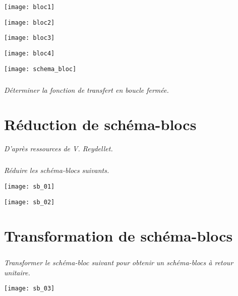 \begin{multicols}{2}
\begin{corrige}
\begin{minipage}[c]{.23\linewidth}
\begin{center}
\texttt{[image: bloc1]}
\end{center}
\end{minipage}\hfill
\begin{minipage}[c]{.23\linewidth}
\begin{center}
\texttt{[image: bloc2]}
\end{center}
\end{minipage}\hfill
\begin{minipage}[c]{.23\linewidth}
\begin{center}
\texttt{[image: bloc3]}
\end{center}
\end{minipage}\hfill
\begin{minipage}[c]{.23\linewidth}
\begin{center}
\texttt{[image: bloc4]}
\end{center}
\end{minipage}



\begin{center}
\texttt{[image: schema\_bloc]}
\end{center}
\end{corrige}
\else 
\fi


\subparagraph{}
\textit{Déterminer la fonction de transfert en boucle fermée.}





\section*{Réduction de schéma-blocs}
\textit{D'après ressources de V. Reydellet.}
\subparagraph*{}
\textit{Réduire les schéma-blocs suivants.}
\begin{center}
\texttt{[image: sb\_01]}
\end{center}

\begin{center}
\texttt{[image: sb\_02]}
\end{center}

\section*{Transformation de schéma-blocs}
\subparagraph*{}
\textit{Transformer le schéma-bloc suivant pour obtenir un schéma-blocs à retour unitaire.}
\begin{center}
\texttt{[image: sb\_03]}
\end{center}


\end{multicols}
